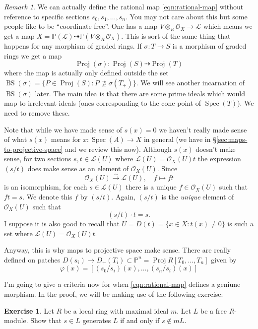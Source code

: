 \documentclass[12pt]{article}
\numberwithin{equation}{section}
\theoremstyle{definition}
\newtheorem{exercise}[theorem]{Exercise}
\theoremstyle{remark}
\newtheorem{remark}[theorem]{Remark}
\newcommand{\Ocal}{\mathcal{O}}
\newcommand{\PP}{\mathbb{P}}
\newcommand{\Spec}{\operatorname{Spec}}
\newcommand{\Proj}{\operatorname{Proj}}
\newcommand{\Lcal}{\mathcal{L}}
\newcommand{\BS}{\operatorname{BS}}
\begin{document}
\begin{remark}
	We can actually define the rational map \eqref{eqn:rational-map} without reference to specific sections $s_0,s_1,\ldots, s_n$. 
	You may not care about this but some people like to be ``coordinate free''. 
	One has a map $V\otimes_R \Ocal_X \to \Lcal$ which means we get a map $X=\PP(\Lcal) \dashrightarrow \PP(V\otimes_R \Ocal_X)$.
	This is sort of the same thing that happens for any morphism of graded rings.
	If $\sigma:T\to S$ is a morphism of graded rings we get a map 
	$$ \Proj(\sigma): \Proj(S) \dashrightarrow \Proj(T) $$
	where the map is actually only defined outside the set $\BS(\sigma) = \lbrace P \in \Proj(S) : P\nsupseteq \sigma(T_+) \rbrace$.
	We will see another incarnation of $\BS(\sigma)$ later. 
	The main idea is that there are some prime ideals which would map to irrelevant ideals (ones corresponding to the cone point of $\Spec(T)$).
	We need to remove these.
 
\end{remark}	
	
Note that while we have made sense of $s(x)=0$ we haven't really made sense of what $s(x)$ means for $x:\Spec(A)\to X$ in general (we have in \S\ref{sec:maps-to-projective-space} and we review this now).
Although $s(x)$ doesn't make sense, for two sections $s,t \in \Lcal(U)$ where $\Lcal(U) = \Ocal_X(U) t$ the expression $(s/t)$ does make sense as an element of $\Ocal_X(U)$. 
Since 
$$\Ocal_X(U) \xrightarrow{\sim} \Lcal(U), \quad f \mapsto f t $$
is an isomorphism, for each $s\in \Lcal(U)$ there is a unique $f\in \Ocal_X(U)$ such that $ft=s$.
We denote this $f$ by $(s/t)$. 
Again, $(s/t)$ is the \emph{unique} element of $\Ocal_X(U)$ such that 
 $$ (s/t) \cdot t = s. $$
I suppose it is also good to recall that $U = D(t) = \lbrace x \in X \colon t(x) \neq 0 \rbrace$ is such a set where $\Lcal(U) = \Ocal_X(U)t$.

Anyway, this is why maps to projective space make sense. 
There are really defined on patches $D(s_i) \to D_+(T_i) \subset \PP^n = \Proj R[T_0,\ldots,T_n]$ given by 
 $$ \varphi(x) = [(s_0/s_i)(x),\ldots,(s_n/s_i)(x)] $$


I'm going to give a criteria now for when \eqref{eqn:rational-map} defines a geniune morphism.
In the proof, we will be making use of the following exercise:
\begin{exercise}
	Let $R$ be a local ring with maximal ideal $m$. Let $L$ be a free $R$-module. 
	Show that $s \in L$ generates $L$ if and only if $s \notin m L$. 
\end{exercise}
\end{document}
